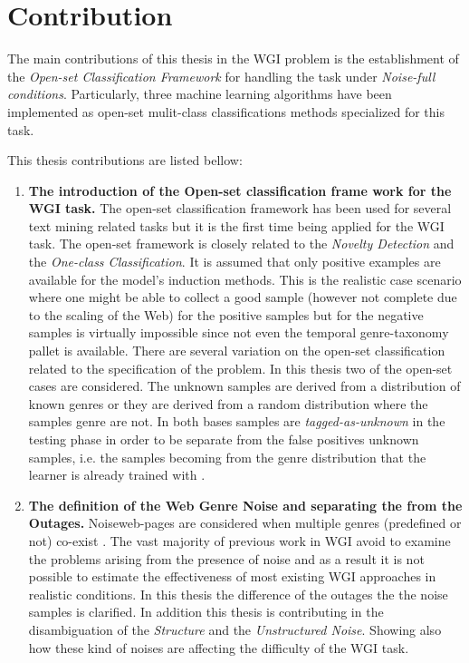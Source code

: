 \section{Contribution} \label{chap:introduction:sec:contribution}

The main contributions of this thesis in the WGI problem is the establishment of the \textit{Open-set Classification Framework} for handling the task under \textit{Noise-full conditions}. Particularly, three machine learning algorithms have been implemented as open-set mulit-class classifications methods specialized for this task. 

This thesis contributions are listed bellow:

\begin{enumerate}
\item \textbf{The introduction of the Open-set classification frame work for the WGI task.} The open-set classification framework has been used for several text mining related tasks but it is the first time being applied for the WGI task. The open-set framework is closely related to the \textit{Novelty Detection} and the \textit{One-class Classification}. It is assumed that only positive examples are available for the model's induction methods. This is the realistic case scenario where one might be able to collect a good sample (however not complete due to the scaling of the Web) for the positive samples but for the negative samples is virtually impossible since not even the temporal genre-taxonomy pallet is available. There are several variation on the open-set classification related to the specification of the problem. In this thesis two of the open-set cases are considered. The unknown samples are derived from a distribution of known genres or they are derived from a random distribution where the samples genre are not. In both bases samples are \textit{tagged-as-unknown} in the testing phase in order to be separate from the false positives unknown samples, i.e. the samples becoming from the genre distribution that the learner is already trained with \parencite{geng2018recent}.
\item \textbf{The definition of  the Web Genre Noise and separating the from the Outages.} {Noise}web-pages are considered when multiple genres (predefined or not) co-exist \parencite{santini2011cross,levering2008using}. The vast majority of previous work in WGI avoid to examine the problems arising from the presence of noise and as a result it is not possible to estimate the effectiveness of most existing WGI approaches in realistic conditions. In this thesis the difference of the outages the the noise samples is clarified. In addition this thesis is contributing in the disambiguation of the \textit{Structure} and the \textit{Unstructured Noise}. Showing also how these kind of noises are affecting the difficulty of the WGI task. 

\end{enumerate}
